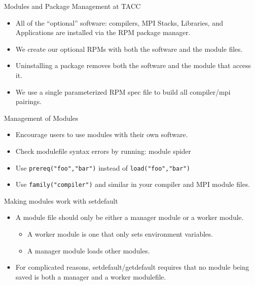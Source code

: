 \documentclass{beamer}
\begin{document}
\begin{frame}{Modules and Package Management at TACC}
  \begin{itemize}
    \item All of the ``optional'' software: compilers, MPI Stacks,
      Libraries, and Applications are installed via the RPM package manager.
    \item We create our optional RPMs with both the software and the
      module files.
    \item Uninstalling a package removes both the software and the
      module that access it.
    \item We use a single parameterized RPM spec file to build all
      compiler/mpi pairings.
  \end{itemize}
\end{frame}

\begin{frame}{Management of Modules}
  \begin{itemize}
    \item Encourage users to use modules with their own software.
    \item Check modulefile syntax errors by running:
       {\color{blue}module spider}
    \item Use {\color{violet}\texttt{prereq("foo","bar")}} instead of
      {\color{violet}\texttt{load("foo","bar")}}
    \item Use  {\color{violet}\texttt{family("compiler")}} and similar
      in your compiler and MPI module files.
  \end{itemize}
\end{frame}

\begin{frame}{Making modules work with setdefault}
  \begin{itemize}
    \item A module file should only be either a manager module or
      a worker module.
      \begin{itemize}
        \item A worker module is one that only sets environment variables.
        \item A manager module loads other modules.
      \end{itemize}
    \item For complicated reasons, setdefault/getdefault requires that
      no module being saved is both a manager and a worker modulefile.
  \end{itemize}
\end{frame}
\end{document}
